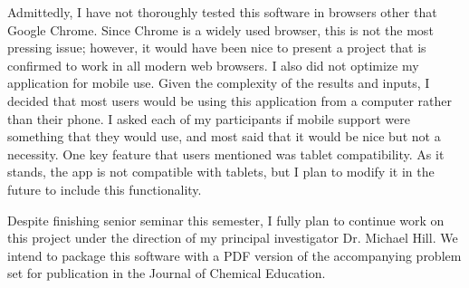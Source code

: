 \documentclass[10pt,twocolumn]{article}
\begin{document}
Admittedly, I have not thoroughly tested this software in browsers other that Google Chrome. Since Chrome is a widely used browser, this is not the most pressing issue; however, it would have been nice to present a project that is confirmed to work in all modern web browsers. I also did not optimize my application for mobile use. Given the complexity of the results and inputs, I decided that most users would be using this application from a computer rather than their phone. I asked each of my participants if mobile support were something that they would use, and most said that it would be nice but not a necessity. One key feature that users mentioned was tablet compatibility. As it stands, the app is not compatible with tablets, but I plan to modify it in the future to include this functionality.

Despite finishing senior seminar this semester, I fully plan to continue work on this project under the direction of my principal investigator Dr. Michael Hill. We intend to package this software with a PDF version of the accompanying problem set for publication in the Journal of Chemical Education.

\printbibliography
\end{document}
